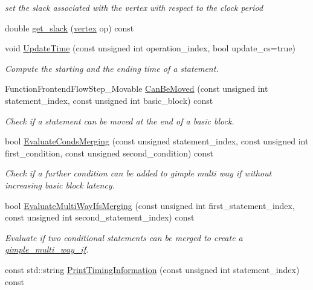\begin{DoxyCompactItemize}
\begin{DoxyCompactList}\small\item\em set the slack associated with the vertex with respect to the clock period \end{DoxyCompactList}\item 
double \hyperlink{classSchedule_a010703d799e98d8c5c3bb7e59ac635c3}{get\+\_\+slack} (\hyperlink{graph_8hpp_abefdcf0544e601805af44eca032cca14}{vertex} op) const
\item 
void \hyperlink{classSchedule_a9eb19889586ce5d16aa8ed1ea356c2ab}{Update\+Time} (const unsigned int operation\+\_\+index, bool update\+\_\+cs=true)
\begin{DoxyCompactList}\small\item\em Compute the starting and the ending time of a statement. \end{DoxyCompactList}\item 
Function\+Frontend\+Flow\+Step\+\_\+\+Movable \hyperlink{classSchedule_aa45880695985aff9d1433a96c23cc960}{Can\+Be\+Moved} (const unsigned int statement\+\_\+index, const unsigned int basic\+\_\+block) const
\begin{DoxyCompactList}\small\item\em Check if a statement can be moved at the end of a basic block. \end{DoxyCompactList}\item 
bool \hyperlink{classSchedule_a65ecdc45dd59e27c5226bc34c16617dd}{Evaluate\+Conds\+Merging} (const unsigned statement\+\_\+index, const unsigned int first\+\_\+condition, const unsigned second\+\_\+condition) const
\begin{DoxyCompactList}\small\item\em Check if a further condition can be added to gimple multi way if without increasing basic block latency. \end{DoxyCompactList}\item 
bool \hyperlink{classSchedule_a735a5c3680d2fac0b2de19e734bc8a96}{Evaluate\+Multi\+Way\+Ifs\+Merging} (const unsigned int first\+\_\+statement\+\_\+index, const unsigned int second\+\_\+statement\+\_\+index) const
\begin{DoxyCompactList}\small\item\em Evaluate if two conditional statements can be merged to create a \hyperlink{structgimple__multi__way__if}{gimple\+\_\+multi\+\_\+way\+\_\+if}. \end{DoxyCompactList}\item 
const std\+::string \hyperlink{classSchedule_a6c882a9f405b563a05ad75371a982aab}{Print\+Timing\+Information} (const unsigned int statement\+\_\+index) const

\end{DoxyCompactItemize}
